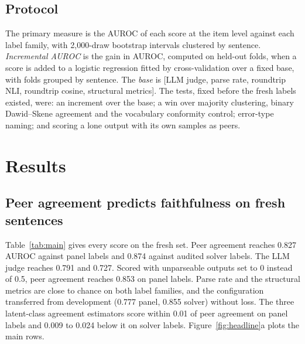 \documentclass[11pt,letterpaper]{article}
\begin{document}
\subsection{Protocol}

The primary measure is the AUROC of each score at the item level against each label family, with 2,000-draw bootstrap intervals clustered by sentence. \emph{Incremental AUROC} is the gain in AUROC, computed on held-out folds, when a score is added to a logistic regression fitted by cross-validation over a fixed base, with folds grouped by sentence. The \emph{base} is [LLM judge, parse rate, roundtrip NLI, roundtrip cosine, structural metrics]. The tests, fixed before the fresh labels existed, were: an increment over the base; a win over majority clustering, binary Dawid--Skene agreement and the vocabulary conformity control; error-type naming; and scoring a lone output with its own samples as peers.

\section{Results}
\label{sec:results}

\subsection{Peer agreement predicts faithfulness on fresh sentences}
\label{sec:main}

Table~\ref{tab:main} gives every score on the fresh set. Peer agreement reaches 0.827 AUROC against panel labels and 0.874 against audited solver labels. The LLM judge reaches 0.791 and 0.727. Scored with unparseable outputs set to 0 instead of 0.5, peer agreement reaches 0.853 on panel labels. Parse rate and the structural metrics are close to chance on both label families, and the configuration transferred from development (0.777 panel, 0.855 solver) without loss. The three latent-class agreement estimators score within 0.01 of peer agreement on panel labels and 0.009 to 0.024 below it on solver labels. Figure~\ref{fig:headline}a plots the main rows.
\end{document}
